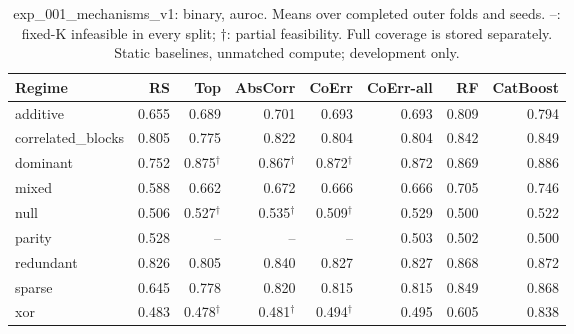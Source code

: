 \begin{table}[t]
\centering\small
\begin{tabular}{lrrrrrrr}
\toprule
Regime & RS & Top & AbsCorr & CoErr & CoErr-all & RF & CatBoost \\
\midrule
additive & 0.655 & 0.689 & 0.701 & 0.693 & 0.693 & 0.809 & 0.794 \\
correlated\_blocks & 0.805 & 0.775 & 0.822 & 0.804 & 0.804 & 0.842 & 0.849 \\
dominant & 0.752 & 0.875$^{\dagger}$ & 0.867$^{\dagger}$ & 0.872$^{\dagger}$ & 0.872 & 0.869 & 0.886 \\
mixed & 0.588 & 0.662 & 0.672 & 0.666 & 0.666 & 0.705 & 0.746 \\
null & 0.506 & 0.527$^{\dagger}$ & 0.535$^{\dagger}$ & 0.509$^{\dagger}$ & 0.529 & 0.500 & 0.522 \\
parity & 0.528 & -- & -- & -- & 0.503 & 0.502 & 0.500 \\
redundant & 0.826 & 0.805 & 0.840 & 0.827 & 0.827 & 0.868 & 0.872 \\
sparse & 0.645 & 0.778 & 0.820 & 0.815 & 0.815 & 0.849 & 0.868 \\
xor & 0.483 & 0.478$^{\dagger}$ & 0.481$^{\dagger}$ & 0.494$^{\dagger}$ & 0.495 & 0.605 & 0.838 \\
\bottomrule
\end{tabular}
\caption{exp\_001\_mechanisms\_v1: binary, auroc. Means over completed outer folds and seeds. --: fixed-K infeasible in every split; $\dagger$: partial feasibility. Full coverage is stored separately. Static baselines, unmatched compute; development only.}
\end{table}
